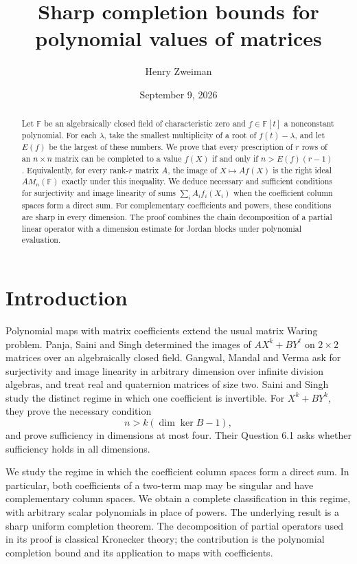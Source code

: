 \documentclass[11pt]{article}
\title{Sharp completion bounds for polynomial values of matrices}
\author{Henry Zweiman}
\date{September 9, 2026}
\theoremstyle{remark}\newtheorem{remark}[theorem]{Remark}
\newcommand{\F}{\mathbb F}
\begin{document}
\maketitle
\begin{abstract}
Let $\F$ be an algebraically closed field of characteristic zero and $f\in\F[t]$ a nonconstant polynomial. For each $\lambda$, take the smallest multiplicity of a root of $f(t)-\lambda$, and let $E(f)$ be the largest of these numbers. We prove that every prescription of $r$ rows of an $n\times n$ matrix can be completed to a value $f(X)$ if and only if $n>E(f)(r-1)$. Equivalently, for every rank-$r$ matrix $A$, the image of $X\mapsto Af(X)$ is the right ideal $AM_n(\F)$ exactly under this inequality. We deduce necessary and sufficient conditions for surjectivity and image linearity of sums $\sum_i A_i f_i(X_i)$ when the coefficient column spaces form a direct sum. For complementary coefficients and powers, these conditions are sharp in every dimension. The proof combines the chain decomposition of a partial linear operator with a dimension estimate for Jordan blocks under polynomial evaluation.
\end{abstract}

\section{Introduction}
Polynomial maps with matrix coefficients extend the usual matrix Waring problem. Panja, Saini and Singh \cite{PSS} determined the images of $AX^k+BY^\ell$ on $2\times2$ matrices over an algebraically closed field. Gangwal, Mandal and Verma \cite[Question 1.1]{GMV} ask for surjectivity and image linearity in arbitrary dimension over infinite division algebras, and treat real and quaternion matrices of size two. Saini and Singh \cite{SS} study the distinct regime in which one coefficient is invertible. For $X^k+BY^k$, they prove the necessary condition
\[
 n>k(\dim\ker B-1),
\]
and prove sufficiency in dimensions at most four. Their Question 6.1 asks whether sufficiency holds in all dimensions.

We study the regime in which the coefficient column spaces form a direct sum. In particular, both coefficients of a two-term map may be singular and have complementary column spaces. We obtain a complete classification in this regime, with arbitrary scalar polynomials in place of powers. The underlying result is a sharp uniform completion theorem. The decomposition of partial operators used in its proof is classical Kronecker theory; the contribution is the polynomial completion bound and its application to maps with coefficients.
\end{document}

